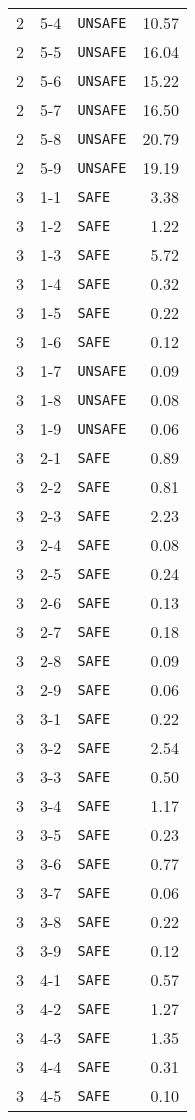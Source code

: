 \documentclass{article}%
\begin{document}
\begin{longtable}{@{}cll|r@{}}
2&5{-}4&\verb|UNSAFE|&10.57\\%
2&5{-}5&\verb|UNSAFE|&16.04\\%
2&5{-}6&\verb|UNSAFE|&15.22\\%
2&5{-}7&\verb|UNSAFE|&16.50\\%
2&5{-}8&\verb|UNSAFE|&20.79\\%
2&5{-}9&\verb|UNSAFE|&19.19\\%
3&1{-}1&\verb|SAFE|&3.38\\%
3&1{-}2&\verb|SAFE|&1.22\\%
3&1{-}3&\verb|SAFE|&5.72\\%
3&1{-}4&\verb|SAFE|&0.32\\%
3&1{-}5&\verb|SAFE|&0.22\\%
3&1{-}6&\verb|SAFE|&0.12\\%
3&1{-}7&\verb|UNSAFE|&0.09\\%
3&1{-}8&\verb|UNSAFE|&0.08\\%
3&1{-}9&\verb|UNSAFE|&0.06\\%
3&2{-}1&\verb|SAFE|&0.89\\%
3&2{-}2&\verb|SAFE|&0.81\\%
3&2{-}3&\verb|SAFE|&2.23\\%
3&2{-}4&\verb|SAFE|&0.08\\%
3&2{-}5&\verb|SAFE|&0.24\\%
3&2{-}6&\verb|SAFE|&0.13\\%
3&2{-}7&\verb|SAFE|&0.18\\%
3&2{-}8&\verb|SAFE|&0.09\\%
3&2{-}9&\verb|SAFE|&0.06\\%
3&3{-}1&\verb|SAFE|&0.22\\%
3&3{-}2&\verb|SAFE|&2.54\\%
3&3{-}3&\verb|SAFE|&0.50\\%
3&3{-}4&\verb|SAFE|&1.17\\%
3&3{-}5&\verb|SAFE|&0.23\\%
3&3{-}6&\verb|SAFE|&0.77\\%
3&3{-}7&\verb|SAFE|&0.06\\%
3&3{-}8&\verb|SAFE|&0.22\\%
3&3{-}9&\verb|SAFE|&0.12\\%
3&4{-}1&\verb|SAFE|&0.57\\%
3&4{-}2&\verb|SAFE|&1.27\\%
3&4{-}3&\verb|SAFE|&1.35\\%
3&4{-}4&\verb|SAFE|&0.31\\%
3&4{-}5&\verb|SAFE|&0.10\\%

\end{longtable}
\end{document}
